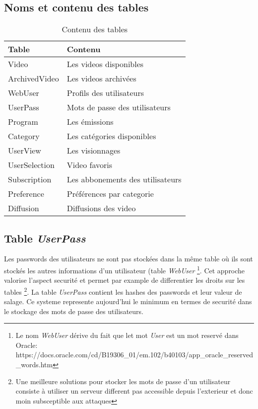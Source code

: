 \documentclass[twoside,openright,a4paper,11pt,french]{article}
\begin{document}
\subsection{Noms et contenu des tables}
\begin{table}[h]
  \centering
  \begin{tabular}{| p{5cm} | l |}
    \hline
    \textbf{Table} & \textbf{Contenu} \\
    \hline
    Video & Les videos disponibles\\
    \hline
    ArchivedVideo  & Les videos archivées \\
    \hline
    WebUser & Profils des utilisateurs \\
    \hline
    UserPass & Mots de passe des utilisateurs \\
    \hline
    Program & Les émissions \\
    \hline
    Category & Les catégories disponibles \\
    \hline
    UserView & Les visionnages \\
    \hline
    UserSelection & Video favoris \\
    \hline
    Subscription & Les abbonements des utilisateurs \\
    \hline
    Preference & Préférences par categorie \\
    \hline
    Diffusion & Diffusions des video \\
    \hline
  \end{tabular}
  \caption{Contenu des tables}
  \label{tab:tables}
\end{table}


\subsection{Table {\it UserPass}}
Les passwords des utilisateurs ne sont pas stockées dans la même table où ils
sont stockés les autres informations d'un utilisateur (table {\it WebUser}
\footnote{Le nom {\it WebUser} dérive du fait que let mot {\it User} est un mot reservé dans Oracle:
https://docs.oracle.com/cd/B19306\_01/em.102/b40103/app\_oracle\_reserved\_words.htm}.
Cet approche valorise l'aspect securité et permet par
example de differentier les droits sur les tables
\footnote{Une meilleure solutions pour stocker les mots de passe d'un
utilisateur consiste à utiliser un serveur different pas accessible depuis
l'exterieur et donc moin subsceptible aux attaques}.
La table {\it UserPass} contient les hashes des passwords et leur valeur de
salage.  Ce systeme represente aujourd'hui le minimum en termes de securité
dans le stockage des mots de passe des utilisateurs.
\end{document}
